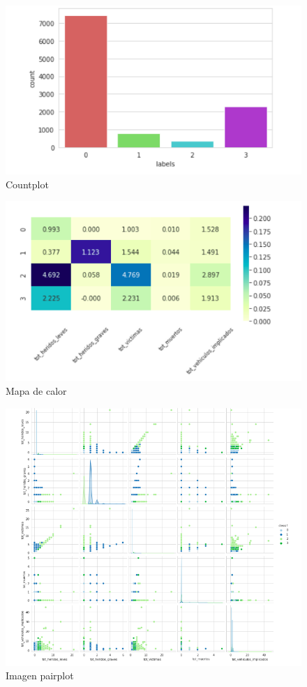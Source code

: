 \documentclass[a4paper,11pt]{book}
\begin{document}
\begin{figure}[H]
	\centering
	\caption[]{Countplot}
	\label{fig:count6}
	\includegraphics[width=0.9\linewidth]{img/count6}
\end{figure}
\begin{figure}[H]
	\centering
	\caption[]{Mapa de calor}
	\label{fig:heatmap6}
	\includegraphics[width=0.9\linewidth]{img/heatmap6}
\end{figure}
\begin{figure}[H]
	\centering
	\caption[]{Imagen pairplot}
	\label{fig:pairplot6}
	\includegraphics[width=1\linewidth]{img/pairplot6}
\end{figure}
\end{document}
